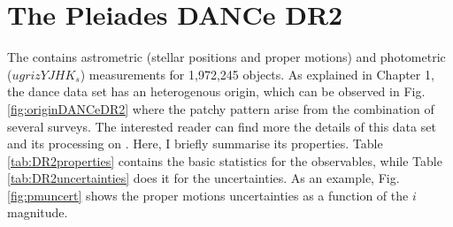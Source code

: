 %

\section{The Pleiades DANCe DR2}
\label{sect:DR2}

The  contains astrometric (stellar positions and proper motions) and photometric ($ugrizYJHK_s$) measurements for 1,972,245 objects. As explained in Chapter 1, the \gls{dance} data set has an heterogenous origin, which can be observed in Fig. \ref{fig:originDANCeDR2} where the patchy pattern arise from the combination of several surveys. The interested reader can find more the details of this data set and its processing on \citet{Bouy2013}. Here, I briefly summarise its properties. Table \ref{tab:DR2properties} contains the basic statistics for the observables, while Table \ref{tab:DR2uncertainties} does it for the uncertainties. As an example, Fig. \ref{fig:pmuncert} shows the proper motions uncertainties as a function of the $i$ magnitude.

